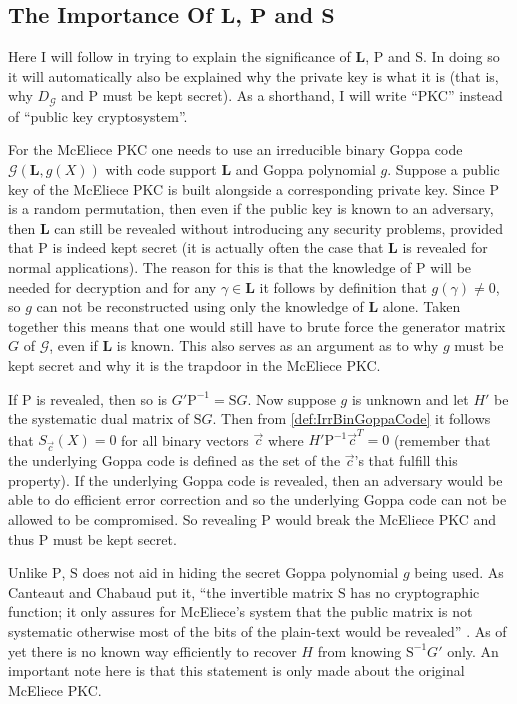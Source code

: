 \subsection{The Importance Of $\mathbf{L}$, $\mathbf{P}$ and $\mathbf{S}$}
\label{subsec:impSP}

Here I will follow \cite{EOS} in trying to explain the significance of $\mathbf{L}$, $\mathrm{P}$ and $\mathrm{S}$. In doing so it will automatically also be explained why the private key is what it is (that is, why $D_{\mathcal{G}}$ and $\mathrm{P}$ must be kept secret). As a shorthand, I will write ``PKC'' instead of ``public key cryptosystem''.

For the McEliece PKC one needs to use an irreducible binary Goppa code $\mathcal{G}\left(\mathbf{L}, g\left(X\right)\right)$ with code support $\mathbf{L}$ and Goppa polynomial $g$. Suppose a public key of the McEliece PKC is built alongside a corresponding private key. Since $\mathrm{P}$ is a random permutation, then even if the public key is known to an adversary, then $\mathbf{L}$ can still be revealed without introducing any security problems, provided that $\mathrm{P}$ is indeed kept secret (it is actually often the case that $\mathbf{L}$ is revealed for normal applications). The reason for this is that the knowledge of $\mathrm{P}$ will be needed for decryption and for any $\gamma \in \mathbf{L}$ it follows by definition that $g\left(\gamma\right) \neq 0$, so $g$ can not be reconstructed using only the knowledge of $\mathbf{L}$ alone. Taken together this means that one would still have to brute force the generator matrix $G$ of $\mathcal{G}$, even if $\mathbf{L}$ is known. This also serves as an argument as to why $g$ must be kept secret and why it is the trapdoor in the McEliece PKC.

If $\mathrm{P}$ is revealed, then so is $G' \mathrm{P}^{-1} = \mathrm{S} G$. Now suppose $g$ is unknown and let $H'$ be the systematic dual matrix of $\mathrm{S}G$. Then from \cref{def:IrrBinGoppaCode} it follows that $S_{\vec{c}}\left(X\right) = 0$ for all binary vectors $\vec{c}$ where $H' \mathrm{P}^{-1} \vec{c}^T = 0$ (remember that the underlying Goppa code is defined as the set of the $\vec{c}$'s that fulfill this property). If the underlying Goppa code is revealed, then an adversary would be able to do efficient error correction and so the underlying Goppa code can not be allowed to be compromised. So revealing $\mathrm{P}$ would break the McEliece PKC and thus $\mathrm{P}$ must be kept secret.

Unlike $\mathrm{P}$, $\mathrm{S}$ does not aid in hiding the secret Goppa polynomial $g$ being used. As Canteaut and Chabaud put it, ``the invertible matrix $\mathrm{S}$ has no cryptographic function; it only assures for McEliece's system that the public matrix is not systematic otherwise most of the bits of the plain-text would be revealed'' \cite[p. 4]{CC}. As of yet there is no known way efficiently to recover $H$ from knowing $\mathrm{S}^{-1} G'$ only. An important note here is that this statement is only made about the original McEliece PKC.



